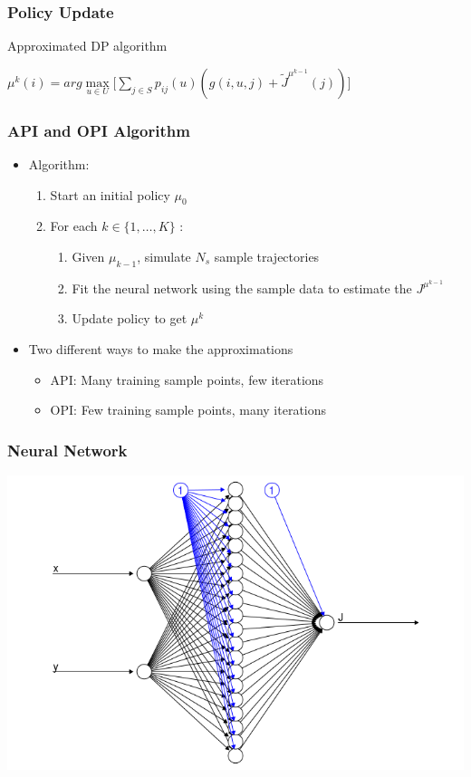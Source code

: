 \documentclass{beamer}
\begin{document}
\begin{frame}
\frametitle{Policy Update}
\begin{block}{Approximated DP algorithm}
\begin{center}
$\mu^{k}(i) = arg\max\limits_{u \in U} \Big[ \sum\limits_{j \in S} p_{ij}(u)(g(i,u,j) +  \widetilde{J}^{\mu^{k-1}}(j))\Big]$
\end{center}
\end{block}
\end{frame}

\begin{frame}
\frametitle{API and OPI Algorithm}
\begin{itemize}
\item Algorithm:
\begin{enumerate}
\item Start an initial policy $\mu_{0}$
\item For each $k \in \{1,\ldots, K\}$ :
\begin{enumerate}
\item Given $\mu_{k-1}$, simulate $N_{s}$ sample trajectories
\item Fit the neural network using the sample data to estimate the $J^{\mu^{k-1}}$
\item Update policy to get $\mu^{k}$
\end{enumerate}
\end{enumerate}
\item Two different ways to make the approximations
\begin{itemize}
\item API: Many training sample points, few iterations
\item OPI: Few training sample points, many iterations
\end{itemize}
\end{itemize}

\end{frame}

\begin{frame}
\frametitle{Neural Network}
\includegraphics[scale=0.65]{neuralnet}
\end{frame}
\end{document}
